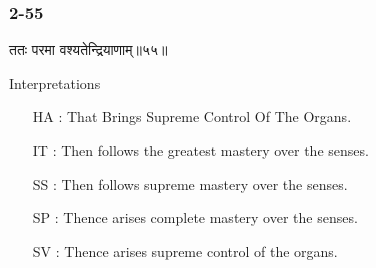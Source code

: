 \begin{frame}[fragile]\frametitle{2-55}
\begin{sanskrit}
ततः परमा वश्यतेन्द्रियाणाम्॥५५॥
\end{sanskrit}

Interpretations
\begin{itemize}
\item [HA]: That Brings Supreme Control Of The Organs.
\item [IT]: Then follows the greatest mastery over the senses.
\item [SS]: Then follows supreme mastery over the senses.
\item [SP]: Thence arises complete mastery over the senses.
\item [SV]: Thence arises supreme control of the organs. 
\end{itemize}
\end{frame}
